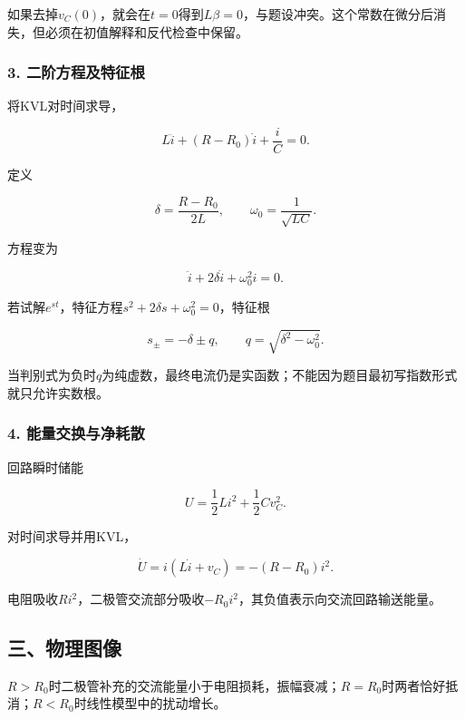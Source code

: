 \documentclass[12pt,a4paper,fontset=fandol]{ctexart}
\begin{document}
如果去掉\(v_C(0)\)，就会在\(t=0\)得到\(L\beta=0\)，与题设冲突。这个常数在微分后消失，但必须在初值解释和反代检查中保留。

\subsubsection{3.
二阶方程及特征根}\label{ux4e8cux9636ux65b9ux7a0bux53caux7279ux5f81ux6839}

将KVL对时间求导，

\[
L\ddot i+(R-R_0)\dot i+\frac iC=0.
\]

定义

\[
\delta=\frac{R-R_0}{2L},\qquad
\omega_0=\frac1{\sqrt{LC}}.
\]

方程变为

\[
\ddot i+2\delta\dot i+\omega_0^2i=0.
\]

若试解\(e^{st}\)，特征方程\(s^2+2\delta s+\omega_0^2=0\)，特征根

\[
s_\pm=-\delta\pm q,\qquad
q=\sqrt{\delta^2-\omega_0^2}.
\]

当判别式为负时\(q\)为纯虚数，最终电流仍是实函数；不能因为题目最初写指数形式就只允许实数根。

\subsubsection{4.
能量交换与净耗散}\label{ux80fdux91cfux4ea4ux6362ux4e0eux51c0ux8017ux6563}

回路瞬时储能

\[
U=\frac12Li^2+\frac12Cv_C^2.
\]

对时间求导并用KVL，

\[
\dot U=i(L\dot i+v_C)=-(R-R_0)i^2.
\]

电阻吸收\(Ri^2\)，二极管交流部分吸收\(-R_0i^2\)，其负值表示向交流回路输送能量。

\subsection{三、物理图像}\label{ux4e09ux7269ux7406ux56feux50cf-2}

\(R>R_0\)时二极管补充的交流能量小于电阻损耗，振幅衰减；\(R=R_0\)时两者恰好抵消；\(R<R_0\)时线性模型中的扰动增长。
\end{document}
